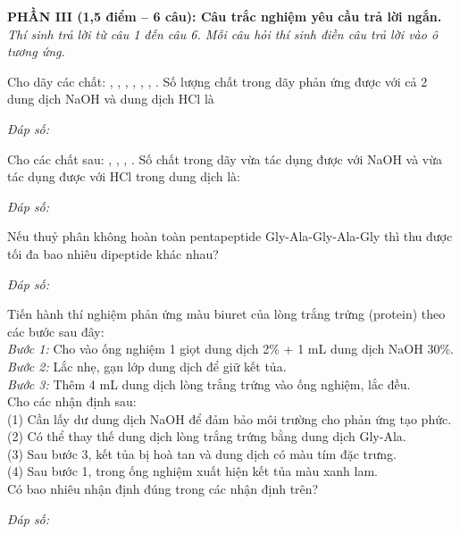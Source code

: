 \documentclass[11pt,a4paper]{article}
\def\loigiai#1{}
\begin{document}
\newpage

\vspace{0.15cm}
\noindent
\textbf{PHẦN III (1,5 điểm -- 6 câu): Câu trắc nghiệm yêu cầu trả lời ngắn.}\\
\textit{Thí sinh trả lời từ câu 1 đến câu 6. Mỗi câu hỏi thí sinh điền câu trả lời vào ô tương ứng.}

\setcounter{ex}{0}

\begin{ex}
Cho dãy các chất: , , , , , , . Số lượng chất trong dãy phản ứng được với cả 2 dung dịch NaOH và dung dịch HCl là
\loigiai{}
\end{ex}
\noindent\textit{Đáp số:} \dotfill\vspace{0.25cm}

\begin{ex}
Cho các chất sau: , , , . Số chất trong dãy vừa tác dụng được với NaOH và vừa tác dụng được với HCl trong dung dịch là:
\loigiai{}
\end{ex}
\noindent\textit{Đáp số:} \dotfill\vspace{0.25cm}

\begin{ex}
Nếu thuỷ phân không hoàn toàn pentapeptide Gly-Ala-Gly-Ala-Gly thì thu được tối đa bao nhiêu dipeptide khác nhau?
\loigiai{}
\end{ex}
\noindent\textit{Đáp số:} \dotfill\vspace{0.25cm}

\begin{ex}
Tiến hành thí nghiệm phản ứng màu biuret của lòng trắng trứng (protein) theo các bước sau đây:\\
\textit{Bước 1:} Cho vào ống nghiệm 1 giọt dung dịch  2\% + 1 mL dung dịch NaOH 30\%.\\
\textit{Bước 2:} Lắc nhẹ, gạn lớp dung dịch để giữ kết tủa.\\
\textit{Bước 3:} Thêm 4 mL dung dịch lòng trắng trứng vào ống nghiệm, lắc đều.\\
Cho các nhận định sau:\\
(1) Cần lấy dư dung dịch NaOH để đảm bảo môi trường cho phản ứng tạo phức.\\
(2) Có thể thay thế dung dịch lòng trắng trứng bằng dung dịch Gly-Ala.\\
(3) Sau bước 3, kết tủa bị hoà tan và dung dịch có màu tím đặc trưng.\\
(4) Sau bước 1, trong ống nghiệm xuất hiện kết tủa màu xanh lam.\\
Có bao nhiêu nhận định đúng trong các nhận định trên?
\loigiai{}
\end{ex}
\noindent\textit{Đáp số:} \dotfill\vspace{0.25cm}
\end{document}
